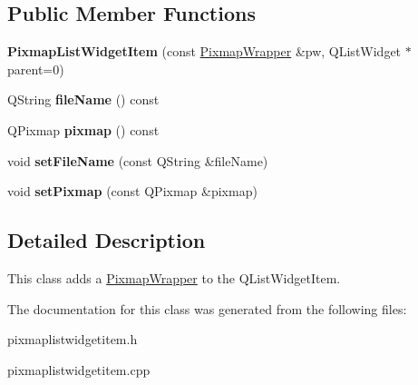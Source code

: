 \subsection*{Public Member Functions}
\begin{DoxyCompactItemize}
\item 
\hypertarget{class_pixmap_list_widget_item_acee9d3c8bed195071cae0b14f6c07d50}{
{\bfseries PixmapListWidgetItem} (const \hyperlink{class_pixmap_wrapper}{PixmapWrapper} \&pw, QListWidget $\ast$parent=0)}
\label{class_pixmap_list_widget_item_acee9d3c8bed195071cae0b14f6c07d50}

\item 
\hypertarget{class_pixmap_list_widget_item_a6ba4922b05db92531bbf25ff0c2d2c1b}{
QString {\bfseries fileName} () const }
\label{class_pixmap_list_widget_item_a6ba4922b05db92531bbf25ff0c2d2c1b}

\item 
\hypertarget{class_pixmap_list_widget_item_ab10b30a7dcaffba7052f9a867ae288fc}{
QPixmap {\bfseries pixmap} () const }
\label{class_pixmap_list_widget_item_ab10b30a7dcaffba7052f9a867ae288fc}

\item 
\hypertarget{class_pixmap_list_widget_item_a4878c69e8af0a5f3ee13477af30c4ee3}{
void {\bfseries setFileName} (const QString \&fileName)}
\label{class_pixmap_list_widget_item_a4878c69e8af0a5f3ee13477af30c4ee3}

\item 
\hypertarget{class_pixmap_list_widget_item_a54c13cb40d01404afeb07dd156d5f261}{
void {\bfseries setPixmap} (const QPixmap \&pixmap)}
\label{class_pixmap_list_widget_item_a54c13cb40d01404afeb07dd156d5f261}

\end{DoxyCompactItemize}


\subsection{Detailed Description}
This class adds a \hyperlink{class_pixmap_wrapper}{PixmapWrapper} to the QListWidgetItem. 

The documentation for this class was generated from the following files:\begin{DoxyCompactItemize}
\item 
pixmaplistwidgetitem.h\item 
pixmaplistwidgetitem.cpp\end{DoxyCompactItemize}
